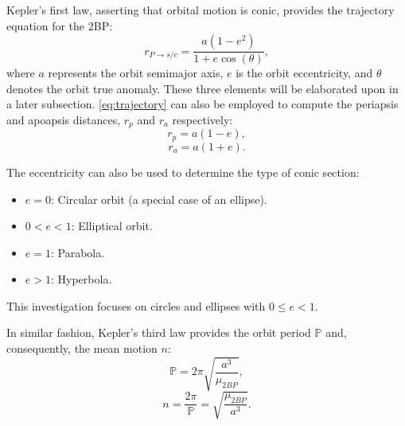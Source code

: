Kepler's first law, asserting that orbital motion is conic, provides the trajectory equation for
the 2BP:
\begin{equation}
    r_{P\rightarrow s/c}=\frac{a(1-e^{2})}{1+e\cos(\theta)},
    \label{eq:trajectory}
\end{equation}
where $a$ represents the orbit semimajor axis, $e$ is the orbit eccentricity, and $\theta$ denotes
the orbit true anomaly. These three elements will be elaborated upon in a later subsection.
\cref{eq:trajectory} can also be employed to compute the periapsis and apoapsis distances, $r_{p}$
and $r_{a}$ respectively:
\begin{equation}
    r_{p}=a(1-e),
    \label{eq:periapsis}
\end{equation}
\begin{equation}
    r_{a}=a(1+e).
    \label{eq:apoapsis}
\end{equation}

The eccentricity can also be used to determine the type of conic section:
\begin{itemize}
    \item   $e=0$: Circular orbit (a special case of an ellipse).
    \item   $0<e<1$: Elliptical orbit.
    \item   $e=1$: Parabola.
    \item   $e>1$: Hyperbola.
\end{itemize}
This investigation focuses on circles and ellipses with $0\leq e<1$.

In similar fashion, Kepler's third law provides the orbit period $\mathbb{P}$ and, consequently,
the mean motion $n$:
\begin{equation}
    \mathbb{P}=2\pi\sqrt{\frac{a^{3}}{\mu_{2BP}}},
    \label{eq:period}
\end{equation}
\begin{equation}
    n=\frac{2\pi}{\mathbb{P}}=\sqrt{\frac{\mu_{2BP}}{a^{3}}}.
    \label{eq:meanmotion}
\end{equation}

